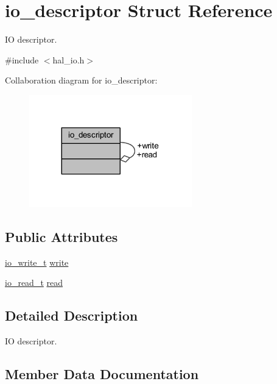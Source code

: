 \hypertarget{structio__descriptor}{}\section{io\+\_\+descriptor Struct Reference}
\label{structio__descriptor}


IO descriptor.  




{\ttfamily \#include $<$hal\+\_\+io.\+h$>$}



Collaboration diagram for io\+\_\+descriptor\+:
\nopagebreak
\begin{figure}[H]
\begin{center}
\leavevmode
\includegraphics[width=200pt]{structio__descriptor__coll__graph}
\end{center}
\end{figure}
\subsection*{Public Attributes}
\begin{DoxyCompactItemize}
\item 
\hyperlink{group__doc__driver__hal__helper__io_gacb03c48993a6786f00946c196c40add1}{io\+\_\+write\+\_\+t} \hyperlink{structio__descriptor_a962235264b6c73e3ab712acb64022194}{write}
\item 
\hyperlink{group__doc__driver__hal__helper__io_ga4d9ae58de2887289fe09eac6f0aa8be7}{io\+\_\+read\+\_\+t} \hyperlink{structio__descriptor_a8ad97905c11dc07cd30373afc0fc146f}{read}
\end{DoxyCompactItemize}


\subsection{Detailed Description}
IO descriptor. 

\subsection{Member Data Documentation}
\mbox{\label{structio__descriptor_a8ad97905c11dc07cd30373afc0fc146f}} 
